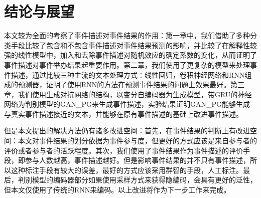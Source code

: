 \documentclass[]{template}
\begin{document}
\section{结论与展望}
本文较为全面的考察了事件描述对事件结果的作用：第一章中，我们借助了多种分类手段比较了包含和不包含事件描述对事件结果预测的影响，并比较了在解释性较强的线性模型中，加入和去除事件描述对随机效应的确定系数的变化，从而证明了事件描述对事件举办结果起重要作用。第二章，我们使用了更复杂的模型来处理事件描述，通过比较三种主流的文本处理方式：线性回归，卷积神经网络和RNN组成的预测器，证明了使用RNN的方法在预测事件结果的问题上效果最好。第三章，我们使用生成对抗网络的结构，以变分自编码器为生成模型，带GRU的神经网络为判别模型的GAN\_PG来生成事件描述，实验结果证明GAN\_PG能够生成与真实事件描述接近的文本，并能够在原有事件描述的基础上改进事件描述。

但是本文提出的解决方法仍有诸多改进空间：首先，在事件结果的判断上有改进空间：本文对事件结果的划分依据为事件参与度，但更好的方式应该是来自参与者的评价或者参与者的活跃程度。其次，我们使用了事件结果作为事件描述的评价手段，即参与人数越高，事件描述越好。但是影响事件结果的并不只有事件描述，所以这种标注手段有较大的误差，最好的方式应该采用群智的手段，人工标注。最后，判别模型的编码器部分如果使用采样方式来获得隐编码，会具有更好的泛性，但本文仅使用了传统的RNN来编码。以上改进将作为下一步工作来完成。
\end{document}
